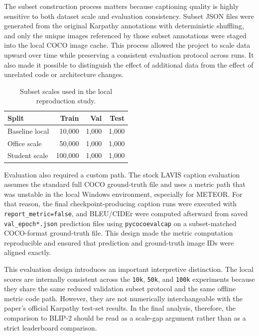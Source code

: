 \documentclass[11pt]{article}
\begin{document}
The subset construction process matters because captioning quality is highly sensitive to both dataset scale and evaluation consistency. Subset JSON files were generated from the original Karpathy annotations with deterministic shuffling, and only the unique images referenced by those subset annotations were staged into the local COCO image cache. This process allowed the project to scale data upward over time while preserving a consistent evaluation protocol across runs. It also made it possible to distinguish the effect of additional data from the effect of unrelated code or architecture changes.

\begin{table}[t]
\centering
\small
\begin{tabular}{lrrr}
\toprule
Split & Train & Val & Test \\
\midrule
Baseline local & 10,000 & 1,000 & 1,000 \\
Office scale & 50,000 & 1,000 & 1,000 \\
Student scale & 100,000 & 1,000 & 1,000 \\
\bottomrule
\end{tabular}
\caption{Subset scales used in the local reproduction study.}
\label{tab:subset-scales}
\end{table}

Evaluation also required a custom path. The stock LAVIS caption evaluation assumes the standard full COCO ground-truth file and uses a metric path that was unstable in the local Windows environment, especially for METEOR. For that reason, the final checkpoint-producing caption runs were executed with \texttt{report\_metric=false}, and BLEU/CIDEr were computed afterward from saved \texttt{val\_epoch*.json} prediction files using \texttt{pycocoevalcap} on a subset-matched COCO-format ground-truth file. This design made the metric computation reproducible and ensured that prediction and ground-truth image IDs were aligned exactly.

This evaluation design introduces an important interpretive distinction. The local scores are internally consistent across the \texttt{10k}, \texttt{50k}, and \texttt{100k} experiments because they share the same reduced validation subset protocol and the same offline metric code path. However, they are not numerically interchangeable with the paper's official Karpathy test-set results. In the final analysis, therefore, the comparison to BLIP-2 should be read as a scale-gap argument rather than as a strict leaderboard comparison.
\end{document}
